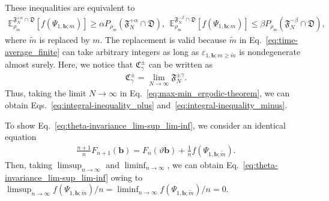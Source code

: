 \documentclass[preprint,pteplogo]{ptephy_v2}%
\numberwithin{equation}{section}
\theoremstyle{definition}
\begin{document}
These inequalities are equivalent to
\begin{align}
\mathbb{E}_{\rho_\mathrm{ss}}^{\mathfrak{F}_N^{+\alpha} \cap \mathfrak{D}}\left[f(\Psi_{1,\bm{b};m})\right]\geq\alpha P_{\rho_\mathrm{ss}}(\mathfrak{F}_N^{+\alpha} \cap \mathfrak{D}),\ \ 
\mathbb{E}_{\rho_\mathrm{ss}}^{\mathfrak{F}_N^{-\beta} \cap \mathfrak{D}}\left[f(\Psi_{1,\bm{b};m})\right]\leq \beta P_{\rho_\mathrm{ss}}(\mathfrak{F}_N^{-\beta} \cap \mathfrak{D}),
\label{eq:max-min_ergodic-theorem}
\end{align}
where $\tilde{m}$ is replaced by $m$. 
The replacement is valid because $\tilde{m}$ in Eq.~\eqref{eq:time-average_finite} can take arbitrary integers as long as $\varepsilon_{1,\bm{b};m\geq\tilde{m}}$ is nondegenerate almost surely. 
Here, we notice that $\mathfrak{C}_\gamma^\pm$ can be written as
\begin{align}
\mathfrak{C}_\gamma^\pm
=\lim_{N\rightarrow\infty}\mathfrak{F}_N^{\pm\gamma}.
\end{align}
Thus, taking the limit $N\rightarrow\infty$ in Eq.~\eqref{eq:max-min_ergodic-theorem}, we can obtain Eqs.~\eqref{eq:integral-inequality_plus} and~\eqref{eq:integral-inequality_minus}.

To show Eq.~\eqref{eq:theta-invariance_lim-sup_lim-inf}, we consider an identical equation
\begin{align}
\frac{n+1}{n}F_{n+1}(\bm{b})
=F_n(\vartheta\bm{b})+\frac{1}{n}f(\Psi_{1,\bm{b};\tilde{m}}).
\end{align}
Then, taking $\limsup_{n\rightarrow\infty}$ and $\liminf_{n\rightarrow\infty}$, we can obtain Eq.~\eqref{eq:theta-invariance_lim-sup_lim-inf} owing to $\limsup_{n\rightarrow\infty}f(\Psi_{1,\bm{b};\tilde{m}})/n=\liminf_{n\rightarrow\infty}f(\Psi_{1,\bm{b};\tilde{m}})/n=0$.
\end{document}
